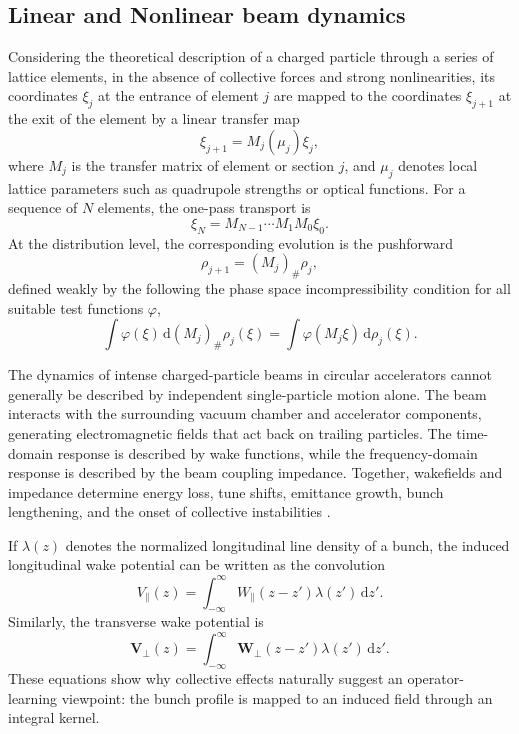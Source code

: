 \documentclass[11pt,a4paper]{article}
\providecommand{\dd}{\,\mathrm{d}}
\begin{document}
\begin{sloppypar}
\subsection{Linear and Nonlinear beam dynamics}

Considering the theoretical description of a charged particle through a series of lattice elements, in the absence of collective forces and strong nonlinearities, its coordinates $\xi_j$ at the entrance of element $j$ are mapped to the coordinates $\xi_{j+1}$ at the exit of the element by a linear transfer map
\begin{equation}
    \xi_{j+1}=M_j(\mu_j)\xi_j,
    \label{eq:linear_particle_transport}
\end{equation}
where $M_j$ is the transfer matrix of element or section $j$, and $\mu_j$ denotes local lattice parameters such as quadrupole strengths or optical functions. For a sequence of $N$ elements, the one-pass transport is
\begin{equation}
    \xi_N=M_{N-1}\cdots M_1M_0\xi_0.
\end{equation}
At the distribution level, the corresponding evolution is the pushforward
\begin{equation}
    \rho_{j+1}=(M_j)_\#\rho_j,
    \label{eq:linear_pushforward}
\end{equation}
defined weakly by the following the phase space incompressibility condition for all suitable test functions $\varphi$,
\begin{equation}
    \int \varphi(\xi)\dd (M_j)_\#\rho_j(\xi)=\int \varphi(M_j\xi)\dd\rho_j(\xi).
\end{equation}

The dynamics of intense charged-particle beams in circular accelerators cannot generally be described by independent single-particle motion alone. The beam interacts with the surrounding vacuum chamber and accelerator components, generating electromagnetic fields that act back on trailing particles. The time-domain response is described by wake functions, while the frequency-domain response is described by the beam coupling impedance. Together, wakefields and impedance determine energy loss, tune shifts, emittance growth, bunch lengthening, and the onset of collective instabilities \cite{metral_wake_2021}.

If $\lambda(z)$ denotes the normalized longitudinal line density of a bunch, the induced longitudinal wake potential can be written as the convolution
\begin{equation}
    V_{\parallel}(z)=\int_{-\infty}^{\infty} W_{\parallel}(z-z')\lambda(z')\dd z'.
    \label{eq:long_wake_potential_revised}
\end{equation}
Similarly, the transverse wake potential is
\begin{equation}
    \bm V_{\perp}(z)=\int_{-\infty}^{\infty}\bm W_{\perp}(z-z')\lambda(z')\dd z'.
    \label{eq:trans_wake_potential_revised}
\end{equation}
These equations show why collective effects naturally suggest an operator-learning viewpoint: the bunch profile is mapped to an induced field through an integral kernel.


\end{sloppypar}
\end{document}
